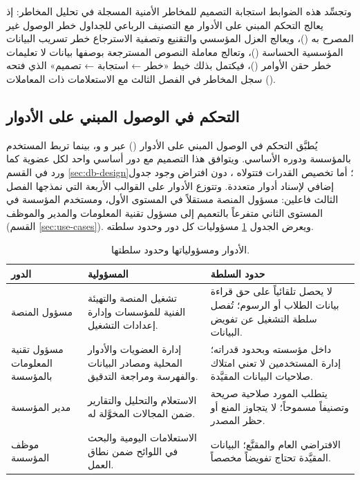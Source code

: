 وتجسِّد هذه الضوابط استجابة التصميم للمخاطر الأمنية المسجلة في تحليل المخاطر: إذ يعالج التحكم المبني على الأدوار مع التصنيف الرباعي للجداول خطر الوصول غير المصرح به ()، ويعالج العزل المؤسسي والتقنيع وتصفية الاسترجاع خطر تسريب البيانات المؤسسية الحساسة ()، وتعالج معاملة النصوص المسترجعة بوصفها بيانات لا تعليمات خطر حقن الأوامر ()، فيكتمل بذلك خيط «خطر ← استجابة ← تصميم» الذي فتحه سجل المخاطر في الفصل الثالث مع الاستعلامات ذات المعاملات ().

\subsection{التحكم في الوصول المبني على الأدوار}
\label{subsec:rbac-matrix}

يُطبَّق التحكم في الوصول المبني على الأدوار () عبر  و و، بينما تربط  المستخدم بالمؤسسة ودوره الأساسي. ويتوافق هذا التصميم مع دور أساسي واحد لكل عضوية كما ورد في القسم \ref{sec:db-design}؛ أما تخصيص القدرات فتتولاه ، دون افتراض وجود جدول إضافي لإسناد أدوار متعددة. وتتوزع الأدوار على القوالب الأربعة التي نمذجها الفصل الثالث فاعلين: مسؤول المنصة مستقلاً في المستوى الأول، ومستخدم المؤسسة في المستوى الثاني متفرعاً بالتعميم إلى مسؤول تقنية المعلومات والمدير والموظف (القسم \ref{sec:use-cases}). ويعرض الجدول \ref{tab:security-roles} مسؤوليات كل دور وحدود سلطته.

\begin{table}[H]
\centering
\caption{الأدوار ومسؤولياتها وحدود سلطتها.}
\label{tab:security-roles}
\scriptsize
\renewcommand{\arraystretch}{1.35}
\begin{tabularx}{\textwidth}{|>{\raggedright\arraybackslash}p{3.0cm}|>{\raggedright\arraybackslash}X|>{\raggedright\arraybackslash}X|}
\hline
\textbf{الدور} & \textbf{المسؤولية} & \textbf{حدود السلطة} \\
\hline
مسؤول المنصة & تشغيل المنصة والتهيئة الفنية للمؤسسات وإدارة إعدادات التشغيل. & لا يحصل تلقائياً على حق قراءة بيانات الطلاب أو الرسوم؛ تُفصل سلطة التشغيل عن تفويض البيانات. \\
\hline
مسؤول تقنية المعلومات بالمؤسسة & إدارة العضويات والأدوار المحلية ومصادر البيانات والفهرسة ومراجعة التدقيق. & داخل مؤسسته وبحدود قدراته؛ إدارة المستخدمين لا تعني امتلاك صلاحيات البيانات المقيَّدة. \\
\hline
مدير المؤسسة & الاستعلام والتحليل والتقارير ضمن المجالات المخوَّلة له. & يتطلب المورد صلاحية صريحة وتصنيفاً مسموحاً؛ لا يتجاوز المنع أو حظر المصدر. \\
\hline
موظف المؤسسة & الاستعلامات اليومية والبحث في اللوائح ضمن نطاق العمل. & الافتراضي العام والمقنَّع؛ البيانات المقيَّدة تحتاج تفويضاً مخصصاً. \\
\hline
\end{tabularx}
\end{table}

